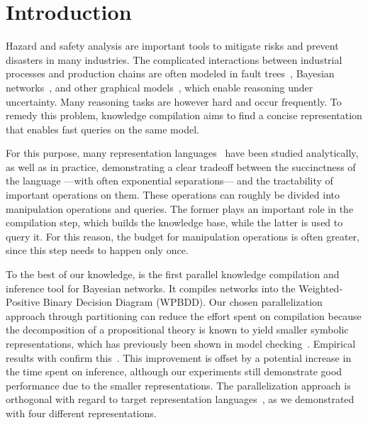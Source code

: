
\section{Introduction}
\label{sec:introduction}

Hazard and safety analysis are important tools to mitigate risks and prevent disasters in many industries. The complicated interactions between industrial processes and production chains are often modeled in fault trees~\cite{sokukcu2022risk}, Bayesian networks~\cite{pearl2011bayesian}, and other graphical models~\cite{kollerfriedman2009,darwiche2022complete}, which enable reasoning under uncertainty.
Many reasoning tasks are however hard and occur frequently. To remedy this problem, knowledge compilation aims to find a concise representation that enables fast queries on the same model.

For this purpose, many representation languages~\cite{chavira2008probabilistic,darwiche2011sdd,hitzler2022tractable,sanner2005affine,tafertshofer1997factored} have been studied analytically, as well as in practice, demonstrating a clear tradeoff between the succinctness of the language ---with often exponential separations--- and the tractability of important operations on them. These operations can roughly be divided into manipulation operations and queries. The former plays an important role in the compilation step, which builds the knowledge base, while the latter is used to query it. For this reason, the budget for manipulation operations is often greater, since this step needs to happen only once.

To the best of our knowledge, \toolname is the first parallel knowledge compilation and inference tool for Bayesian networks. It compiles networks into the Weighted-Positive Binary Decision Diagram (WPBDD). Our chosen parallelization approach through partitioning can reduce the effort spent on compilation because the decomposition of a propositional theory is known to yield smaller symbolic representations, which has previously been shown in model checking~\cite{narayan1996partitioned,sahoo2004partitioning,darwiche2021quantifying,darwiche2022complete}. Empirical results with \toolname confirm this~\cite{dal2017reducing}.
 This improvement is offset by a potential increase in the time spent on inference, although our experiments still demonstrate good performance due to the smaller representations. The parallelization approach is orthogonal with regard to target representation languages~\cite{dal2018parallel}, as we demonstrated with four different representations.

